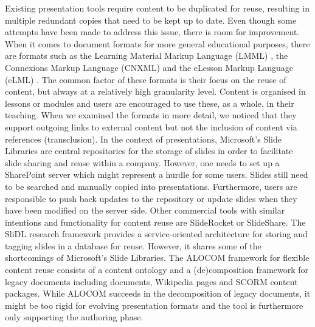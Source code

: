    Existing presentation tools require content to be duplicated for reuse,
   resulting in multiple redundant copies that need to be kept up to date.
   Even though some attempts have been made to address this issue, there is
   room for improvement. When it comes to document formats for more general
   educational purposes, there are formats such as the Learning Material Markup
   Language (LMML) \citep{suss-1}, the Connexions Markup Language (CNXML) and
   the eLesson Markup Language (eLML) \citep{fisler-1}. The common factor of
   these formats is their focus on the reuse of content, but always at a
   relatively high granularity level. Content is organised in lessons or
   modules and users are encouraged to use these, as a whole, in their
   teaching. When we examined the formats in more detail, we noticed that they
   support outgoing links to external content but not the inclusion of content
   via references (transclusion). In the context of presentations, Microsoft's
   Slide Libraries are central repositories for the storage of slides in order
   to facilitate slide sharing and reuse within a company. However, one needs
   to set up a SharePoint server which might represent a hurdle for some users.
   Slides still need to be searched and manually copied into presentations.
   Furthermore, users are responsible to push back updates to the repository or
   update slides when they have been modified on the server side. Other
   commercial tools with similar intentions and functionality for content reuse
   are SlideRocket or SlideShare. The SliDL \citep{canos-1} research framework
   provides a service-oriented architecture for storing and tagging slides in a
   database for reuse. However, it shares some of the shortcomings of
   Microsoft's Slide Libraries. The ALOCOM \citep{verbert-1} framework for
   flexible content reuse consists of a content ontology and a (de)composition
   framework for legacy documents including \ppt documents, Wikipedia pages and
   SCORM content packages. While ALOCOM succeeds in the decomposition of legacy
   documents, it might be too rigid for evolving presentation formats and the
   tool is furthermore only supporting the authoring phase.

